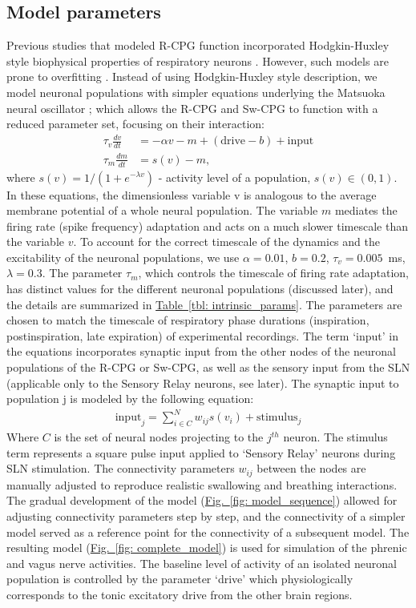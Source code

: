 \documentclass[pdflatex,sn-mathphys-ay]{sn-jnl}%
\renewcommand{\figureautorefname}{Fig.}
\renewcommand{\tableautorefname}{Table}
\newcommand{\Figref}[2][]{\hyperref[#2]{\figureautorefname~\ref*{#2}#1}}
\newcommand{\Tableref}[2][]{\hyperref[#2]{\tableautorefname~\ref*{#2}#1}}
\theoremstyle{thmstyleone}%
\theoremstyle{thmstyletwo}%
\theoremstyle{thmstylethree}%
\begin{document}
\subsection{Model parameters}
Previous studies that modeled R-CPG function incorporated Hodgkin-Huxley style biophysical properties of respiratory neurons \citep{smith2007spatial, rubin2009multiple, molkov2013control, molkov2014closed, molkov2017computational}. However, such models are prone to overfitting \citep{del2018breathing}. Instead of using Hodgkin-Huxley style description, we model neuronal populations with simpler equations underlying the Matsuoka neural oscillator \citep{matsuoka2011analysis}; which allows the R-CPG and Sw-CPG to function with a reduced parameter set, focusing on their interaction:
\begin{align*}
 \tau_v \frac{dv}{dt} &= -\alpha v - m + (\text{drive} - b)+\text{input} \\
 \tau_m \frac{dm}{dt} &= s(v) - m, 
\end{align*}
where $s(v) = 1/(1+e^{-\lambda v} )$ - activity level of a population, $s(v) \in (0,1)$.
In these equations, the dimensionless variable v is analogous to the average membrane potential of a whole neural population. The variable $m$ mediates the firing rate (spike frequency) adaptation and acts on a much slower timescale than the variable $v$. To account for the correct timescale of the dynamics and the excitability of the neuronal populations, we use $\alpha=0.01$, $b=0.2$, $\tau_v=0.005$~ms, $\lambda=0.3$. The parameter $\tau_m$, which controls the timescale of firing rate adaptation, has distinct values for the different neuronal populations (discussed later), and the details are summarized in \Tableref{tbl: intrinsic_params}. The parameters are chosen to match the timescale of respiratory phase durations (inspiration, postinspiration, late expiration) of experimental recordings.
The term `input' in the equations incorporates synaptic input from the other nodes of the neuronal populations of the R-CPG or Sw-CPG, as well as the sensory input from the SLN (applicable only to the Sensory Relay neurons, see later). The synaptic input to population j is modeled by the following equation:
\begin{align*}
 \text{input}_j = \sum_{i \in C}^N w_{ij} s(v_i) +\text{stimulus}_j 
\end{align*}
Where $C$ is the set of neural nodes projecting to the $j^{th}$ neuron.
The stimulus term represents a square pulse input applied to `Sensory Relay' neurons during SLN stimulation.
The connectivity parameters $w_{ij}$ between the nodes are manually adjusted to reproduce realistic swallowing and breathing interactions. The gradual development of the model (\Figref[]{fig: model_sequence}) allowed for adjusting connectivity parameters step by step, and the connectivity of a simpler model served as a reference point for the connectivity of a subsequent model. The resulting model (\Figref[]{fig: complete_model}) is used for simulation of the phrenic and vagus nerve activities. The baseline level of activity of an isolated neuronal population is controlled by the parameter `drive' which physiologically corresponds to the tonic excitatory drive from the other brain regions.
\end{document}
